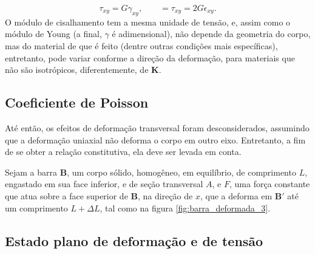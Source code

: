 \begin{equation}
    \tau_{xy} = G \gamma_{xy}, \qquad = \tau_{xy} = 2G \epsilon_{xy}.
\end{equation}
O módulo de cisalhamento tem a mesma unidade de tensão, e, assim como o módulo de Young (a final, $\gamma$ é adimensional), não depende da geometria do corpo, mas do material de que é feito (dentre outras condições mais específicas), entretanto, pode variar conforme a direção da deformação, para materiais que não são isotrópicos, diferentemente, de $\bm{K}$.


\subsection{Coeficiente de Poisson}

Até então, os efeitos de deformação transversal foram desconsiderados, assumindo que a deformação uniaxial não deforma o corpo em outro eixo. Entretanto, a fim de se obter a relação constitutiva, ela deve ser levada em conta.

Sejam a barra $\bm{B}$, um corpo sólido, homogêneo, em equilíbrio, de comprimento $L$, engastado em sua face inferior, e de seção transversal $A$, e $F$, uma força constante que atua sobre a face superior de $\bm{B}$, na direção de $x$, que a deforma em $\bm{B}'$ até um comprimento $L+\Delta L$, tal como na figura \ref{fig:barra_deformada_3}.

\subsection{Estado plano de deformação e de tensão}